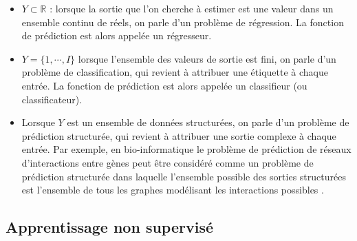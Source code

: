 \documentclass[12pt, french]{report}
\begin{document}
\begin{itemize} 
\item $Y \subset \mathbb{R}$  : lorsque la sortie que l'on cherche à estimer est une valeur dans un ensemble continu de réels, on parle d'un problème de régression. La fonction de prédiction est alors appelée un régresseur.
\item $Y = \{ 1, \cdots, I \} $ lorsque l'ensemble des valeurs de sortie est fini, on parle d'un problème de classification, qui revient à attribuer une étiquette à chaque entrée. La fonction de prédiction est alors appelée un classifieur (ou classificateur).
\item Lorsque  $Y$ est un ensemble de données structurées, on parle d'un problème de prédiction structurée, qui revient à attribuer une sortie complexe à chaque entrée. Par exemple, en bio-informatique le problème de prédiction de réseaux d’interactions entre gènes peut être considéré comme un problème de prédiction structurée dans laquelle l'ensemble possible des sorties structurées est l'ensemble de tous les graphes modélisant les interactions possibles \cite{key14}.
\end{itemize}





\subsection{Apprentissage non supervisé}
 
\end{document}
